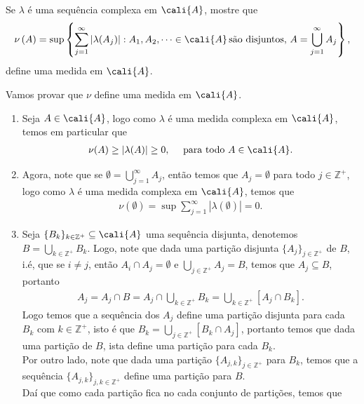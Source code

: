 \begin{homeworkProblem}[7]
  Se $\lambda$ é uma sequência complexa em $\cali{A}$, mostre que
  \begin{align*}
    \nu\left( A \right)=\sup\left\{ \sum_{j=1}^{\infty}|\lambda(A_j)|:A_1,A_2,\cdots\in\cali{A}\,\text{são disjuntos, }A=\bigcup_{j=1}^{\infty}A_j \right\},
  \end{align*}
  define uma medida em $\cali{A}$.
  \begin{solution}
    Vamos provar que $\nu$ define uma medida em $\cali{A}$.
    \begin{enumerate}
      \item Seja $A\in\cali{A}$, logo como $\lambda$ é uma medida complexa em $\cali{A}$, temos em particular que
        \begin{align*}
          \nu(A)\geq|\lambda(A)|\geq 0,\quad\text{ para todo }A\in\cali{A}.
        \end{align*}
      \item Agora, note que se $\emptyset=\bigcup_{j=1}^{\infty}A_j$, então temos que $A_j=\emptyset$ para todo $j\in\mathbb{Z}^{+}$, logo como $\lambda$ é uma medida complexa em $\cali{A}$, temos que 
        \begin{align*}
          \nu(\emptyset)=\sup\sum_{j=1}^{\infty}|\lambda(\emptyset)|=0.
        \end{align*}
      \item Seja $\{B_k\}_{k\in\mathbb{Z}^{+}}\subseteq\cali{A}$  uma sequência disjunta, denotemos $B=\bigcup_{k\in\mathbb{Z}^{+}}B_k$. Logo, note que dada uma partição disjunta $\{A_j\}_{j\in\mathbb{Z}^{+}}$ de $B$, i.é, que se $i\neq j$, então $A_i\cap A_j=\emptyset$ e $\bigcup_{j\in\mathbb{Z}^{+}}A_j=B$, temos que $A_j\subseteq B$, portanto
        \begin{align*}
          A_j=A_j\cap B=A_j\cap \bigcup_{k\in\mathbb{Z}^{+}}B_k=\bigcup_{k\in\mathbb{Z}^{+}}[A_j\cap B_k].
        \end{align*}
        Logo temos que a sequência dos $A_j$ define uma partição disjunta para cada $B_k$ com $k\in\mathbb{Z}^{+}$, isto é que $B_k=\bigcup_{j\in\mathbb{Z}^{+}}[B_k\cap A_j]$, portanto temos que dada uma partição de $B$, ista define uma partição para cada $B_k$.\\
        Por outro lado, note que dada uma partição $\{A_{j,k}\}_{j\in\mathbb{Z}^{+}}$ para $B_k$, temos que a sequência $\{A_{j,k}\}_{j,k\in\mathbb{Z}^{+}}$ define uma partição para $B$.\\
        Daí que como cada partição fica no cada conjunto de partições, temos que

\end{enumerate}
\end{solution}
\end{homeworkProblem}
